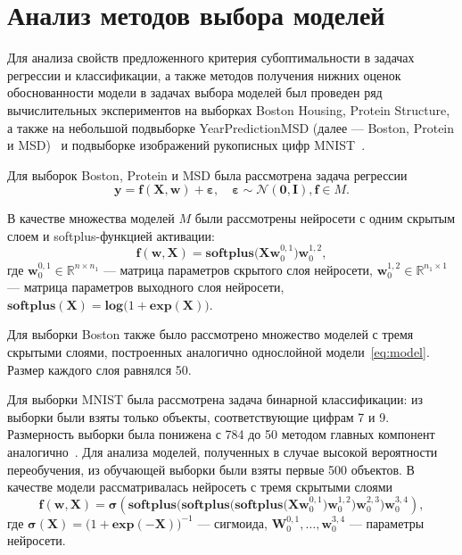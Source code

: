 \section{Анализ методов выбора моделей}
Для анализа свойств предложенного критерия субоптимальности в задачах регрессии и классификации, а также методов получения нижних оценок обоснованности модели в задачах выбора моделей был проведен ряд вычислительных экспериментов на выборках Boston Housing, Protein Structure, а также на небольшой подвыборке YearPredictionMSD (далее --- Boston, Protein и MSD)~\cite{UCI} {и подвыборке изображений рукописных цифр MNIST~\cite{mnist}}.

{Для выборок Boston, Protein и MSD} была рассмотрена задача регрессии
\[
	\mathbf{y} = \mathbf{f}(\mathbf{X}, \mathbf{w}) + \boldsymbol{\varepsilon}, \quad  \boldsymbol{\varepsilon} \sim \mathcal{N}(\mathbf{0}, \mathbf{I}), \mathbf{f} \in {M}.
\]

В качестве множества моделей $M$ были рассмотрены  нейросети с одним скрытым слоем и softplus-функцией активации:
\begin{equation}
\label{eq:model}
	\mathbf{f}(\mathbf{w}, \mathbf{X}) =   \textbf{softplus}\bigl(\mathbf{X} \mathbf{w}_0^{0,1} \bigr)  \mathbf{w}_0^{1,2},
\end{equation}
где $\mathbf{w}_0^{0,1}  \in \mathbb{R}^{n\times n_1}$ --- матрица параметров скрытого слоя нейросети, $\mathbf{w}_0^{1,2} \in \mathbb{R}^{n_1\times 1}$ --- матрица параметров выходного слоя нейросети, {$\textbf{softplus}(\mathbf{X}) = \textbf{log}\bigl(1+\textbf{exp}(\mathbf{X})\bigr)$}.

{Для выборки Boston также было рассмотрено множество моделей с тремя скрытыми слоями, построенных аналогично однослойной модели~\eqref{eq:model}. Размер каждого слоя равнялся 50.}

{Для выборки MNIST была рассмотрена задача бинарной классификации: из выборки были взяты только объекты, соответствующие цифрам 7 и 9. Размерность выборки была понижена с 784 до 50 методом главных компонент аналогично~\cite{firefly}. Для анализа моделей, полученных в случае высокой вероятности переобучения, из обучающей выборки были взяты первые 500 объектов. В качестве модели рассматривалась нейросеть с тремя скрытыми слоями}
\[
    \mathbf{f}(\mathbf{w}, \mathbf{X}) =   \boldsymbol{\sigma}(\textbf{softplus}\bigl(  \textbf{softplus} \bigl(\textbf{softplus}\bigl(\mathbf{X} \mathbf{w}_0^{0,1} \bigr)  \mathbf{w}_0^{1,2} \bigr) \mathbf{w}_0^{2,3} \bigr) \mathbf{w}_0^{3,4}),
\]
{где $\boldsymbol{\sigma}(\mathbf{X}) = \bigl(1+\textbf{exp}(\mathbf{-X})\bigr)^{-1}$  --- сигмоида, $\mathbf{W}_0^{0,1}, \dots, \mathbf{w}_0^{3,4}$ --- параметры нейросети.}



